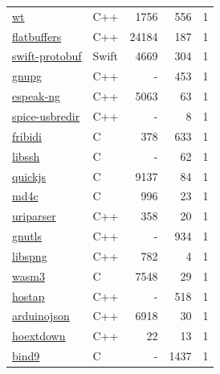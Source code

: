 \begin{table}[p]
\begin{minipage}[t]{.32\textwidth}
{\begin{tabular}[t]{@{}llrrr@{}}
\href{https://www.webtoolkit.eu/wt}{wt} & C++ & 1756 & 556 & 1 \\
\href{https://github.com/google/flatbuffers}{flatbuffers} & C++ & 24184 & 187 & 1 \\
\href{https://github.com/apple/swift-protobuf}{swift-protobuf} & Swift & 4669 & 304 & 1 \\
\href{https://www.gnupg.org}{gnupg} & C++ & - & 453 & 1 \\
\href{https://github.com/espeak-ng/espeak-ng}{espeak-ng} & C++ & 5063 & 63 & 1 \\
\href{https://www.spice-space.org/usbredir.html}{spice-usbredir} & C++ & - & 8 & 1 \\
\href{https://github.com/fribidi/fribidi}{fribidi} & C & 378 & 633 & 1 \\
\href{https://libssh.org/}{libssh} & C & - & 62 & 1 \\
\href{https://bellard.org/quickjs/}{quickjs} & C & 9137 & 84 & 1 \\
\href{https://github.com/mity/md4c}{md4c} & C & 996 & 23 & 1 \\
\href{https://github.com/uriparser/uriparser}{uriparser} & C++ & 358 & 20 & 1 \\
\href{https://www.gnutls.org}{gnutls} & C++ & - & 934 & 1 \\
\href{https://libspng.org}{libspng} & C++ & 782 & 4 & 1 \\
\href{https://github.com/wasm3/wasm3}{wasm3} & C & 7548 & 29 & 1 \\
\href{https://w1.fi/cvs.html}{hostap} & C++ & - & 518 & 1 \\
\href{https://github.com/bblancho-rduinoJson}{arduinojson} & C++ & 6918 & 30 & 1 \\
\href{https://github.com/kjdev/hoextdown}{hoextdown} & C++ & 22 & 13 & 1 \\
\href{https://gitlab.isc.org/isc-projects/bind9}{bind9} & C & - & 1437 & 1 \\

\bottomrule
\end{tabular}
}
\end{minipage}

\end{table}
